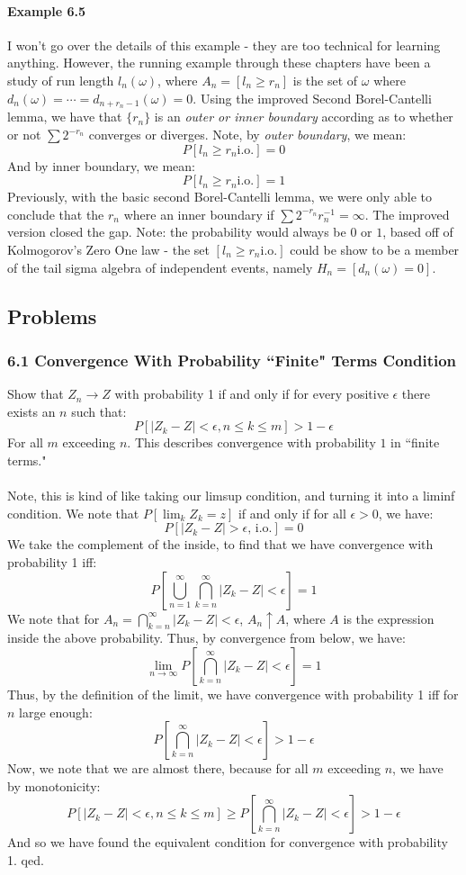 \documentclass[12pt,a4paper]{article}
\newcommand{\1}[1]{\mathbbm{1}\left\{ #1 \right\}}
\newcommand{\io}{\text{i.o.}}
\begin{document}
\paragraph{Example 6.5} I won't go over the details of this example - they are too technical for learning anything. However, the running example through these chapters have been a study of run length $l_n(\omega)$, where $A_n = [l_n \geq r_n]$ is the set of $\omega$ where $d_n(\omega) = \cdots = d_{n + r_n - 1}(\omega) = 0$. Using the improved Second Borel-Cantelli lemma, we have that $\{r_n\}$ is an \textit{outer or inner boundary} according as to whether or not $\sum 2^{-r_n}$ converges or diverges. Note, by \textit{outer boundary}, we mean:
$$
	P[l_n \geq r_n \io] = 0
$$
And by inner boundary, we mean:
$$
	P[l_n \geq r_n \io] = 1
$$
Previously, with the basic second Borel-Cantelli lemma, we were only able to conclude that the $r_n$ where an inner boundary if $\sum 2^{-r_n}r_n^{-1} = \infty$. The improved version closed the gap. Note: the probability would always be $0$ or $1$, based off of Kolmogorov's Zero One law - the set $[l_n \geq r_n \io]$ could be show to be a member of the tail sigma algebra of independent events, namely $H_n = [d_n(\omega) = 0]$.

\subsection{Problems}
\subsubsection{6.1 Convergence With Probability ``Finite" Terms Condition} Show that $Z_n \to Z$ with probability 1 if and only if for every positive $\epsilon$ there exists an $n$ such that:
$$
	P[|Z_k - Z| < \epsilon, n \leq k \leq m] > 1 - \epsilon
$$
For all $m$ exceeding $n$. This describes convergence with probability $1$ in ``finite terms."
\\\\
Note, this is kind of like taking our limsup condition, and turning it into a liminf condition. We note that $P[\lim_k Z_k = z]$ if and only if for all $\epsilon > 0$, we have:
$$
	P\left[|Z_k - Z| > \epsilon ,\, \io\right] = 0
$$
We take the complement of the inside, to find that we have convergence with probability 1 iff:
$$
	P\left[\bigcup_{n=1}^\infty \bigcap_{k=n}^\infty |Z_k - Z| < \epsilon\right] = 1
$$
We note that for $A_n = \bigcap_{k=n}^\infty |Z_k - Z| < \epsilon$, $A_n \uparrow A$, where $A$ is the expression inside the above probability. Thus, by convergence from below, we have:
$$
	\lim_{n \to \infty} P\left[\bigcap_{k=n}^\infty |Z_k - Z| < \epsilon\right] = 1
$$
Thus, by the definition of the limit, we have convergence with probability 1 iff for $n$ large enough:
$$
	P\left[\bigcap_{k=n}^\infty |Z_k - Z| < \epsilon\right] > 1 - \epsilon
$$
Now, we note that we are almost there, because for all $m$ exceeding $n$, we have by monotonicity:
$$
	P[|Z_k - Z| < \epsilon, n \leq k \leq m] \geq 
	P\left[\bigcap_{k=n}^\infty |Z_k - Z| < \epsilon\right]
	> 1 - \epsilon
$$
And so we have found the equivalent condition for convergence with probability 1. qed.
\end{document}
